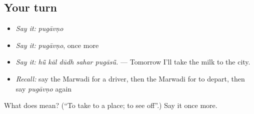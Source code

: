 \subsection*{Your turn}
\begin{itemize}
\raggedright
  \item \emph{Say it:} \emph{pugāvṇo}
  \item \emph{Say it:} \emph{pugāvṇo}, once more
  \item \emph{Say it:} \emph{hū̃ kāl dūdh sahar pugāsū̃.} — Tomorrow I'll take the milk to the city.
  \item \emph{Recall:} say the Marwadi for a driver, then the Marwadi for to depart, then say \emph{pugāvṇo} again
\end{itemize}

\begin{tcolorbox}[breakable,colback=teal!4,colframe=teal!35!black,title={Before you move on}]
What does  mean? (\textquotedblleft{}To take to a place; to see off\textquotedblright{}.) Say it once more.
\end{tcolorbox}
